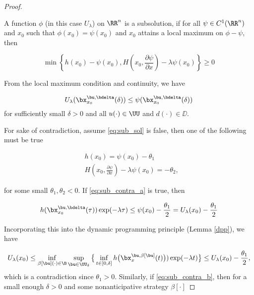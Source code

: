 \begin{for_journal}
\begin{proof}
\begin{definition} A function $\phi$ (in this case $U_{\lambda}$) on $\RR^n$  is a subsolution, if for all $\psi \in C^1(\RR^n)$ and $x_0$ such that $\phi(x_0) = \psi(x_0)$ and $x_0$ attains a local maximum on $\phi- \psi$, then

\begin{equation}\label{eq:sub_sol}
    \min\left\{h(x_0)-\psi(x_0), H(x_0,\frac{\partial \psi}{\partial x}) - \lambda \psi(x_0)\right\} \geq 0
\end{equation}
\end{definition}

From the local maximum condition and continuity, we have

\begin{equation*}
U_{\lambda}(\bx_{x_0}^{\bu, \bdelta}(\delta)) \leq \psi(\bx_{x_0}^{\bu, \bdelta}(\delta))
\end{equation*}%
\noindent for sufficiently small $\delta>0$ and all $u(\cdot) \in \UU$ and $d(\cdot) \in \DD$.

For sake of contradiction, assume \eqref{eq:sub_sol} is false, then one of the following must be true

\begin{subequations}
\begin{align}
&h(x_0) = \psi(x_0) - \theta_1 \label{eq:sub_contra_a}\\
&H(x_0,\frac{\partial \psi}{\partial x}) - \lambda \psi(x_0) = -\theta_2 \label{eq:sub_contra_b},
\end{align} 
\end{subequations}

for some small $\theta_1, \theta_2 < 0$. If \eqref{eq:sub_contra_a} is true, then 

\begin{equation}
h(\bx_{x_0}^{\bu, \bdelta}(\tau))\exp(-\lambda \tau) \leq \psi(x_0) - \frac{\theta_1}{2} = U_{\lambda}(x_0) - \frac{\theta_1}{2}
\end{equation}

Incorporating this into the dynamic programming principle (Lemma \ref{dpp}), we have 

\begin{equation}
U_{\lambda}(x_0) \leq \inf_{\beta[\bu](\cdot) \in \B} \sup_{\bu \in \UU_\delta}
\big \{\inf_{t \in [0, \delta]} h\big(\bx_{x}^{\bu,\beta[\bu]}(t)\big))\exp(-\lambda  t) \big \} \leq U_{\lambda}(x_0) - \frac{\theta_1}{2},
\end{equation}%
\noindent which is a contradiction since $\theta_1>0$. Similarly, if \eqref{eq:sub_contra_b}, then for a small enough $\delta>0$ and some nonanticipative strategy $\beta[\cdot]$ 


\end{proof}
\end{for_journal}
